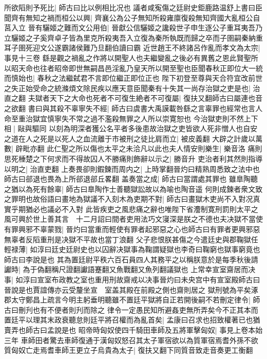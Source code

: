 所欲䧟則予死比|{
	師古曰比以例相比况也}
議者咸寃傷之廷尉史鉅鹿路温舒上書曰臣聞齊有無知之禍而桓公以興|{
	齊襄公為公子無知所殺雍廪復殺無知齊國大亂桓公自莒入立}
晉有驪姬之難而文公用伯|{
	晉獻公信驪姬之讒殺世子申生逐公子重耳夷吾乃立驪姬之子奚齊卓子皆為里克所殺夷吾入立復為秦所執既而歸之卒而子圉嗣秦納重耳子圉死迎文公遂霸諸侯難乃旦翻伯讀曰霸}
近世趙王不終諸呂作亂而孝文為太宗|{
	事見十三卷}
繇是觀之禍亂之作將以開聖人也夫繼變亂之後必有異舊之恩此賢聖所以昭天命也往者昭帝即世無嗣昌邑淫亂乃皇天所以開至聖也臣聞春秋正即位大一統而慎始也|{
	春秋之法繼弑君不言即位繼正即位正也}
陛下初登至尊與天合符宜改前世之失正始受命之統滌煩文除民疾以應天意臣聞秦有十失其一尚存治獄之吏是也|{
	治直之翻}
夫獄者天下之大命也死者不可復生絶者不可復屬|{
	復扶又翻師古曰屬連也音之欲翻}
書曰與其殺不辜寧失不經|{
	師古曰虞書大禹謨載咎繇之言辜罪也經常也言人命至重治獄宜慎寧失不常之過不濫殺無罪之人所以崇寛恕也}
今治獄吏則不然上下相|{
	敺與驅同}
以刻為明深者獲公名平者多後患故治獄之吏皆欲人死非憎人也自安之道在人之死是以死人之血流離于市被刑之徒比肩而立|{
	被皮義翻}
大辟之計歲以萬數|{
	辟毗亦翻}
此仁聖之所以傷也太平之未洽凡以此也夫人情安則樂生|{
	樂音洛}
痛則思死棰楚之下何求而不得故囚人不勝痛則飾辭以示之|{
	勝音升}
吏治者利其然則指導以明之|{
	治直吏翻}
上奏畏卻則鍜鍊而周内之|{
	上時掌翻晉灼曰精熟周悉致之法中也師古曰郤退也畏為上所郤退郤丘畧翻}
盖奏當之成|{
	師古曰當謂處其罪也}
雖臯陶聽之猶以為死有餘辜|{
	師古曰臯陶作士善聽獄訟故以為喻也陶音遥}
何則成鍊者衆文致之罪明也故俗語曰畫地為獄議不入刻木為吏期不對|{
	師古曰畫獄木吏尚不入對况真實乎期猶必也議必不入對}
此皆疾吏之風悲痛之辭也唯陛下省灋制寛刑罰則太平之風可興於世上善其言　十二月詔曰間者吏用法巧文寖深是朕之不德也夫决獄不當使有罪興邪不辜蒙戮|{
	晉灼曰當重而輕使有罪者起邪惡之心也師古曰有罪者更興邪惡無辜者反䧟重刑是决獄不平故也當丁浪翻}
父子悲恨朕甚傷之今遣廷史與郡鞠獄任輕禄薄|{
	如淳曰廷史廷尉史也以囚辭决獄事為鞠謂疑獄也李奇曰鞠窮也獄事窮竟也師古曰李說是也}
其為置廷尉平秩六百石員四人其務平之以稱朕意於是每季秋後請讞時|{
	為于偽翻稱尺證翻讞語蹇翻又魚戰翻又魚列翻議獄也}
上常幸宣室齋居而决事|{
	如淳曰宣室布政教之室也重用刑故齋戒以决事晉灼曰未央宫中有宣室殿師古曰晉說是也賈誼傳亦云受釐坐宣　室盖其殿在前殿之側也齋則居之}
獄刑號為平矣涿郡太守鄭昌上疏言今明主躬垂明聽雖不置廷平獄將自正若開後嗣不若刪定律令|{
	師古曰刪刋也有不便者則刋而除之}
律令一定愚民知所避姦吏無所弄矣今不正其本而置廷平以理其末政衰聽怠則廷平將召權而為亂首矣|{
	孟康曰召求也招致權著已也猶賣弄也師古曰孟說是也}
昭帝時匈奴使四千騎田車師及五將軍擊匈奴|{
	事見上卷本始三年}
車師田者驚去車師復通于漢匈奴怒召其太子軍宿欲以為質軍宿焉耆外孫不欲質匈奴亡走焉耆車師王更立子烏貴為太子|{
	復扶又翻下同質音致走音奏更工衡翻}

